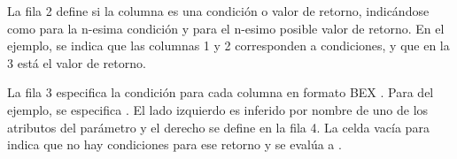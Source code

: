 La fila 2 define si la columna es una condición o valor de retorno, indicándose como   para la n-esima condición y  para el n-esimo posible valor de retorno.
En el ejemplo, se indica que las columnas 1 y 2 corresponden a condiciones, y que en la 3 está el valor de retorno.

La fila 3 especifica la condición para cada columna en formato BEX \cite{openl}.
Para  del ejemplo, se especifica .
El lado izquierdo es inferido por nombre de uno de los atributos del parámetro  y el derecho se define en la fila 4.
La celda vacía para  indica que no hay condiciones para ese retorno y se evalúa a .







